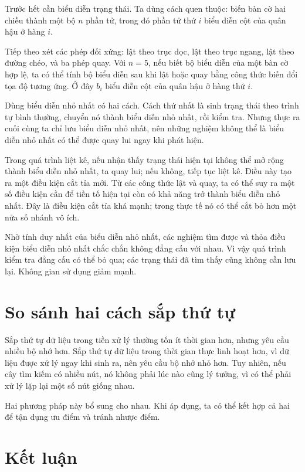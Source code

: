 \documentclass[11pt]{article}
\begin{document}
Trước hết cần biểu diễn trạng thái. Ta dùng cách quen thuộc: biến bàn cờ hai
chiều thành một bộ \(n\) phần tử, trong đó phần tử thứ \(i\) biểu diễn cột của
quân hậu ở hàng \(i\).

Tiếp theo xét các phép đối xứng: lật theo trục dọc, lật theo trục ngang, lật
theo đường chéo, và ba phép quay. Với \(n=5\), nếu biết bộ biểu diễn của một
bàn cờ hợp lệ, ta có thể tính bộ biểu diễn sau khi lật hoặc quay bằng công
thức biến đổi tọa độ tương ứng. Ở đây \(b_i\) biểu diễn cột của quân hậu ở
hàng thứ \(i\).

Dùng biểu diễn nhỏ nhất có hai cách. Cách thứ nhất là sinh trạng thái theo
trình tự bình thường, chuyển nó thành biểu diễn nhỏ nhất, rồi kiểm tra. Nhưng
thực ra cuối cùng ta chỉ lưu biểu diễn nhỏ nhất, nên những nghiệm không thể là
biểu diễn nhỏ nhất có thể được quay lui ngay khi phát hiện.

Trong quá trình liệt kê, nếu nhận thấy trạng thái hiện tại không thể mở rộng
thành biểu diễn nhỏ nhất, ta quay lui; nếu không, tiếp tục liệt kê. Điều này
tạo ra một điều kiện cắt tỉa mới. Từ các công thức lật và quay, ta có thể suy
ra một số điều kiện cần để tiền tố hiện tại còn có khả năng trở thành biểu
diễn nhỏ nhất. Đây là điều kiện cắt tỉa khá mạnh; trong thực tế nó có thể cắt
bỏ hơn một nửa số nhánh vô ích.

Nhờ tính duy nhất của biểu diễn nhỏ nhất, các nghiệm tìm được và thỏa điều
kiện biểu diễn nhỏ nhất chắc chắn không đẳng cấu với nhau. Vì vậy quá trình
kiểm tra đẳng cấu có thể bỏ qua; các trạng thái đã tìm thấy cũng không cần
lưu lại. Không gian sử dụng giảm mạnh.

\section{So sánh hai cách sắp thứ tự}

Sắp thứ tự dữ liệu trong tiền xử lý thường tốn ít thời gian hơn, nhưng yêu cầu
nhiều bộ nhớ hơn. Sắp thứ tự dữ liệu trong thời gian thực linh hoạt hơn, vì
dữ liệu được xử lý ngay khi sinh ra, nên yêu cầu bộ nhớ nhỏ hơn. Tuy nhiên,
nếu cây tìm kiếm có nhiều nút, nó không phải lúc nào cũng lý tưởng, vì có thể
phải xử lý lặp lại một số nút giống nhau.

Hai phương pháp này bổ sung cho nhau. Khi áp dụng, ta có thể kết hợp cả hai để
tận dụng ưu điểm và tránh nhược điểm.

\section{Kết luận}
\end{document}

